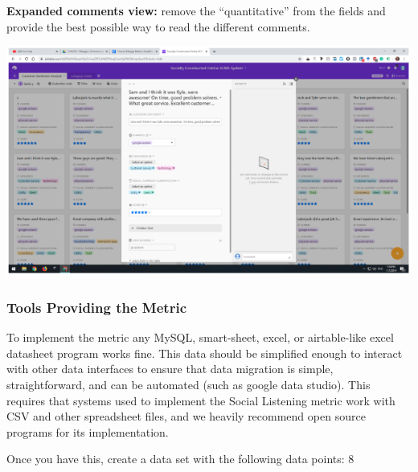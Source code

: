 \textbf{Expanded comments view:} remove the ``quantitative'' from the
fields and provide the best possible way to read the different comments.

\includegraphics{images/social-listening_expanded-comment.png}

\hypertarget{tools-providing-the-metric}{%
\subsubsection{Tools Providing the
Metric}\label{tools-providing-the-metric}}

To implement the metric any MySQL, smart-sheet, excel, or airtable-like
excel datasheet program works fine. This data should be simplified
enough to interact with other data interfaces to ensure that data
migration is simple, straightforward, and can be automated (such as
google data studio). This requires that systems used to implement the
Social Listening metric work with CSV and other spreadsheet files, and
we heavily recommend open source programs for its implementation.

Once you have this, create a data set with the following data points: 8

